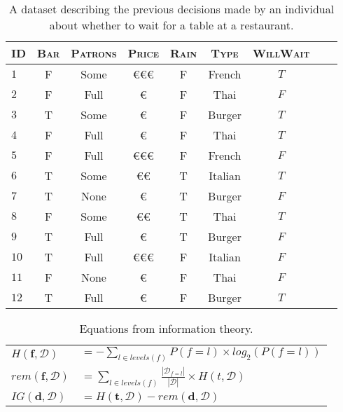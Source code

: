\documentclass[--SOLUTION-OPTION--]{ditpaper}
\begin{document}
\begin{table}[h]
\begin{center}
\begin{tabular}{lcccccccc}
\hline
\textsc{ID} & \textsc{Bar} & \textsc{Patrons} & \textsc{Price} & \textsc{Rain} & \textsc{Type} & \textsc{WillWait} \\
\hline
$1$  & F & Some & \euro\euro\euro & F & French &  $T$\\
$2$    & F & Full & \euro & F & Thai &  $F$\\
$3$    & T & Some & \euro & F & Burger &  $T$\\
$4$    & F & Full & \euro & F & Thai  &  $T$\\
$5$    & F & Full & \euro\euro\euro & F & French &  $F$\\
$6$    & T & Some & \euro\euro & T & Italian &  $T$\\
$7$    & T & None & \euro & T & Burger &  $F$\\
$8$    & F & Some & \euro\euro & T & Thai &  $T$\\
$9$     & T & Full & \euro & T & Burger &  $F$\\
$10$ & T & Full & \euro\euro\euro & F & Italian &  $F$\\
$11$ & F & None & \euro & F & Thai &  $F$\\
$12$ & T & Full & \euro & F & Burger &  $T$\\
\hline
\end{tabular}
\end{center}
\label{tab:rest}
\caption{A dataset describing the previous decisions made by an individual about whether to wait for a table at a restaurant.}
\end{table}

	\begin{table}[!hb]
			\renewcommand{\arraystretch}{2}
	\begin{center}
	\caption{Equations from information theory.}
	\label{tab:info-eqs}
		\begin{tabular}{ll}
	\hline
	$H(\mathbf{f}, \mathcal{D})$ & $= -\displaystyle\sum_{l \in levels(f)} P(f=l) \times log_2(P(f=l))$\\
	$rem(\mathbf{f}, \mathcal{D})$ & $=\displaystyle\sum_{l \in levels(f)} \frac{|\mathcal{D}_{f=l}|}{|\mathcal{D}|} \times H(t, \mathcal{D})$\\
	$IG(\mathbf{d},\mathcal{D})$ & $=H(\mathbf{t}, \mathcal{D})-rem(\mathbf{d}, \mathcal{D})$\\
	\hline
	\end{tabular}
	\end{center}
	\end{table}		
\end{document}
